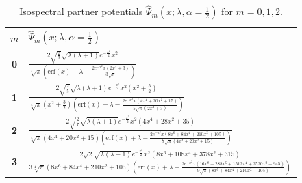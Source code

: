 \documentclass[12pt]{article}
\begin{document}
\begin{table}[htp]
\centering
\begin{tabularx}{\textwidth}{>{\bfseries}c|X}
\toprule
$m$ & $\hat{\Psi}_m(x;\lambda,\alpha=\frac{1}{2})$ \\
\midrule
0 & $\frac{2 \sqrt{\frac{2}{3}} \sqrt{\lambda  (\lambda +1)} e^{-\frac{x^2}{2}} x^2}{\sqrt[4]{\pi } \left(\text{erf}(x)+\lambda -\frac{2 e^{-x^2} x \left(2 x^2+3\right)}{3 \sqrt{\pi }}\right)}$\\
1 & $\frac{2 \sqrt{\frac{2}{5}} \sqrt{\lambda  (\lambda +1)} e^{-\frac{x^2}{2}} x^2 \left(x^2+\frac{5}{2}\right)}{\sqrt[4]{\pi } \left(x^2+\frac{3}{2}\right) \left(\text{erf}(x)+\lambda -\frac{2 e^{-x^2} x \left(4 x^4+20 x^2+15\right)}{5 \sqrt{\pi } \left(2 x^2+3\right)}\right)}$\\
2 & $\frac{2 \sqrt{\frac{2}{7}} \sqrt{\lambda  (\lambda +1)} e^{-\frac{x^2}{2}} x^2 \left(4 x^4+28 x^2+35\right)}{\sqrt[4]{\pi } \left(4 x^4+20 x^2+15\right) \left(\text{erf}(x)+\lambda -\frac{2 e^{-x^2} x \left(8 x^6+84 x^4+210 x^2+105\right)}{7 \sqrt{\pi } \left(4 x^4+20 x^2+15\right)}\right)}$\\
3 & $\frac{2 \sqrt{2} \sqrt{\lambda  (\lambda +1)} e^{-\frac{x^2}{2}} x^2 \left(8 x^6+108 x^4+378 x^2+315\right)}{3 \sqrt[4]{\pi } \left(8 x^6+84 x^4+210 x^2+105\right) \left(\text{erf}(x)+\lambda -\frac{2 e^{-x^2} x \left(16 x^8+288 x^6+1512 x^4+2520 x^2+945\right)}{9 \sqrt{\pi } \left(8 x^6+84 x^4+210 x^2+105\right)}\right)}$\\
\bottomrule
\end{tabularx}
\caption{Isospectral partner potentials $\hat{\Psi}_m(x;\lambda,\alpha=\frac{1}{2})$ for $m=0,1,2$.}
\label{tab:isospectral-GS-alphaPlus}
\end{table}
\end{document}
